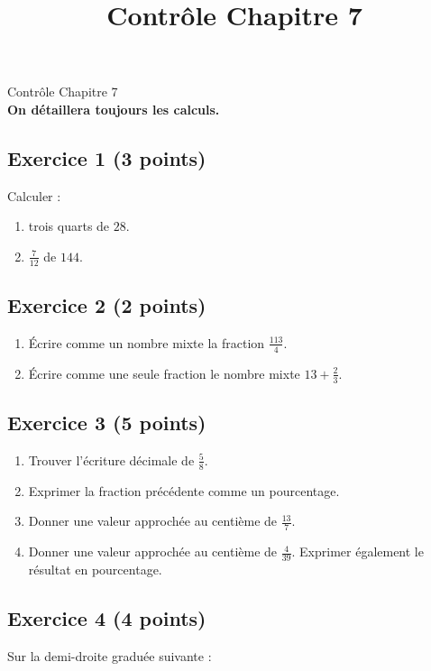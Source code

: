 \documentclass[14 pt]{extarticle}
\title{Contrôle Chapitre 7}
\date{}
\theoremstyle{plain}
\begin{document}
\begin{center}{\Large Contrôle Chapitre 7}\\  
\textbf{On détaillera toujours les calculs.}
 \end{center}
 

\subsection*{Exercice 1 (3 points)}
Calculer :
\begin{enumerate}
\item trois quarts de $28$. 
\item $\frac{7}{12}$ de $144$.
\end{enumerate}
\subsection*{Exercice 2 (2 points)}
\begin{enumerate}
\item Écrire comme un nombre mixte la fraction $\frac{113}{4}$.
\item Écrire comme une seule fraction le nombre mixte $13+ \frac23$.
\end{enumerate}
\subsection*{Exercice 3 (5 points)}
\begin{enumerate}
\item Trouver l'écriture décimale de $\frac{5}8$. 
\item Exprimer la fraction précédente comme un pourcentage.
\item Donner une valeur approchée au centième de $\frac{13}7$. 
\item Donner une valeur approchée au centième de $\frac{4}{39}$. Exprimer également le résultat en pourcentage.
\end{enumerate}

\subsection*{Exercice 4 (4 points)}
Sur la demi-droite graduée suivante : 
\end{document}
